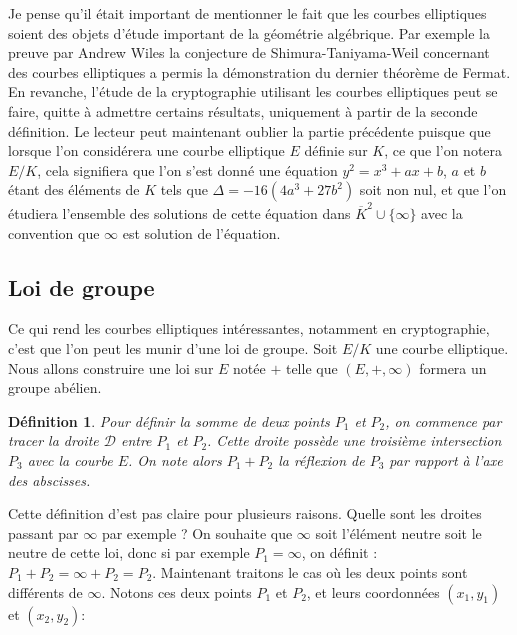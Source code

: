 \documentclass{article}
\theoremstyle{plain}%
\newtheorem{deff}[thm]{Définition}
\theoremstyle{definition}%
\newcommand{\ol}{\overline}
\begin{document}
Je pense qu'il était important de mentionner le fait que les courbes elliptiques soient des objets d'étude important de la géométrie algébrique. Par exemple la preuve par Andrew Wiles la conjecture de Shimura-Taniyama-Weil concernant des courbes elliptiques a permis la démonstration du dernier théorème de Fermat. En revanche, l'étude de la cryptographie utilisant les courbes elliptiques peut se faire, quitte à admettre certains résultats, uniquement à partir de la seconde définition. 
Le lecteur peut maintenant oublier la partie précédente puisque que lorsque l'on considérera une courbe elliptique $E$ définie sur $K$, ce que l'on notera $E/K$, cela signifiera que l'on s'est donné une équation $y^2 = x^3 + ax + b$, $a$ et $b$ étant des éléments de $K$ tels que $\Delta =-16(4a^3+ 27b^2)$ soit non nul, et que l'on étudiera l'ensemble des solutions de cette équation dans $\ol K^2\cup \{\infty\}$ avec la convention que $\infty$ est solution de l'équation.


\subsection{Loi de groupe}

Ce qui rend les courbes elliptiques intéressantes, notamment en cryptographie, c'est que l'on peut les munir d'une loi de groupe. Soit $E/K$ une courbe elliptique. Nous allons construire une loi sur $E$ notée $+$ telle que $(E, +, \infty)$ formera un groupe abélien.

\begin{deff}
Pour définir la somme de deux points $P_1$ et $P_2$, on commence par tracer la droite $\mathcal D$ entre $P_1$ et $P_2$. Cette droite possède une troisième intersection $P_3$ avec la courbe $E$. On note alors $P_1 + P_2$ la réflexion de $P_3$ par rapport à l'axe des abscisses.
\end{deff}

Cette définition d'est pas claire pour plusieurs raisons. Quelle sont les  droites passant par $\infty$ par exemple ? On souhaite que $\infty$ soit l'élément neutre soit le neutre de cette loi, donc si par exemple $P_1=\infty$, on définit : $P_1+P_2 = \infty+P_2 = P_2$.
Maintenant traitons le cas où les deux points sont différents de $\infty$. Notons ces deux points $P_1$ et $P_2$, et leurs coordonnées $(x_1, y_1)$ et $(x_2, y_2)$:
\end{document}
